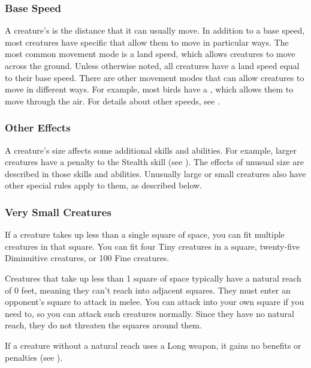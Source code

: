         \subsubsection{Base Speed}\label{Base Speed}
            A creature's  is the distance that it can usually move.
            In addition to a base speed, most creatures have specific  that allow them to move in particular ways.
            The most common movement mode is a land speed, which allows creatures to move across the ground.
            Unless otherwise noted, all creatures have a land speed equal to their base speed.
            There are other movement modes that can allow creatures to move in different ways.
            For example, most birds have a , which allows them to move through the air.
            For details about other speeds, see .

        \subsubsection{Other Effects}
            A creature's size affects some additional skills and abilities.
            For example, larger creatures have a penalty to the Stealth skill (see ).
            The effects of unusual size are described in those skills and abilities.
            Unusually large or small creatures also have other special rules apply to them, as described below.

        \subsubsection{Very Small Creatures}
             If a creature takes up less than a single square of space, you can fit multiple creatures in that square. You can fit four Tiny creatures in a square, twenty-five Diminuitive creatures, or 100 Fine creatures.

             Creatures that take up less than 1 square of space typically have a natural reach of 0 feet, meaning they can't reach into adjacent squares. They must enter an opponent's square to attack in melee. You can attack into your own square if you need to, so you can attack such creatures normally. Since they have no natural reach, they do not threaten the squares around them.

            If a creature without a natural reach uses a Long weapon, it gains no benefits or penalties (see ).

